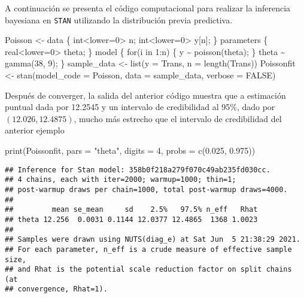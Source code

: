 \documentclass[
  12pt,
  spanish,
]{book}
\newenvironment{Shaded}{\begin{snugshade}}{\end{snugshade}}
\newcommand{\AttributeTok}[1]{\textcolor[rgb]{0.77,0.63,0.00}{#1}}
\newcommand{\ConstantTok}[1]{\textcolor[rgb]{0.00,0.00,0.00}{#1}}
\newcommand{\DecValTok}[1]{\textcolor[rgb]{0.00,0.00,0.81}{#1}}
\newcommand{\FloatTok}[1]{\textcolor[rgb]{0.00,0.00,0.81}{#1}}
\newcommand{\FunctionTok}[1]{\textcolor[rgb]{0.00,0.00,0.00}{#1}}
\newcommand{\NormalTok}[1]{#1}
\newcommand{\OtherTok}[1]{\textcolor[rgb]{0.56,0.35,0.01}{#1}}
\newcommand{\StringTok}[1]{\textcolor[rgb]{0.31,0.60,0.02}{#1}}
\theoremstyle{definition}
\theoremstyle{definition}
\theoremstyle{definition}
\theoremstyle{definition}
\theoremstyle{remark}
\begin{document}
A continuación se presenta el código computacional para realizar la inferencia bayesiana en \texttt{STAN} utilizando la distribución previa predictiva.

\begin{Shaded}
\begin{Highlighting}[]
\NormalTok{Poisson }\OtherTok{\textless{}{-}} \StringTok{\textquotesingle{}}
\StringTok{data \{}
\StringTok{  int\textless{}lower=0\textgreater{} n;}
\StringTok{  int\textless{}lower=0\textgreater{} y[n];}
\StringTok{\}}
\StringTok{parameters \{}
\StringTok{  real\textless{}lower=0\textgreater{} theta;}
\StringTok{\}}
\StringTok{model \{}
\StringTok{  for(i in 1:n) \{}
\StringTok{  y \textasciitilde{} poisson(theta);}
\StringTok{  \}}
\StringTok{  theta \textasciitilde{} gamma(38, 9);}
\StringTok{\}}
\StringTok{\textquotesingle{}}
\NormalTok{sample\_data }\OtherTok{\textless{}{-}} \FunctionTok{list}\NormalTok{(}\AttributeTok{y =}\NormalTok{ Trans, }\AttributeTok{n =} \FunctionTok{length}\NormalTok{(Trans))}
\NormalTok{Poissonfit }\OtherTok{\textless{}{-}} \FunctionTok{stan}\NormalTok{(}\AttributeTok{model\_code =}\NormalTok{ Poisson,}
               \AttributeTok{data =}\NormalTok{ sample\_data, }\AttributeTok{verbose =} \ConstantTok{FALSE}\NormalTok{)}
\end{Highlighting}
\end{Shaded}

Después de converger, la salida del anterior código muestra que a estimación puntual dada por 12.2545 y un intervalo de credibilidad al 95\%, dado por \((12.026, 12.4875)\), mucho más estrecho que el intervalo de credibilidad del anterior ejemplo

\begin{Shaded}
\begin{Highlighting}[]
\FunctionTok{print}\NormalTok{(Poissonfit, }\AttributeTok{pars =} \StringTok{"theta"}\NormalTok{, }
      \AttributeTok{digits =} \DecValTok{4}\NormalTok{, }\AttributeTok{probs =} \FunctionTok{c}\NormalTok{(}\FloatTok{0.025}\NormalTok{, }\FloatTok{0.975}\NormalTok{))}
\end{Highlighting}
\end{Shaded}

\begin{verbatim}
## Inference for Stan model: 358b0f218a279f070c49ab235fd030cc.
## 4 chains, each with iter=2000; warmup=1000; thin=1; 
## post-warmup draws per chain=1000, total post-warmup draws=4000.
## 
##         mean se_mean     sd    2.5%   97.5% n_eff   Rhat
## theta 12.256  0.0031 0.1144 12.0377 12.4865  1368 1.0023
## 
## Samples were drawn using NUTS(diag_e) at Sat Jun  5 21:38:29 2021.
## For each parameter, n_eff is a crude measure of effective sample size,
## and Rhat is the potential scale reduction factor on split chains (at 
## convergence, Rhat=1).
\end{verbatim}
\end{document}
